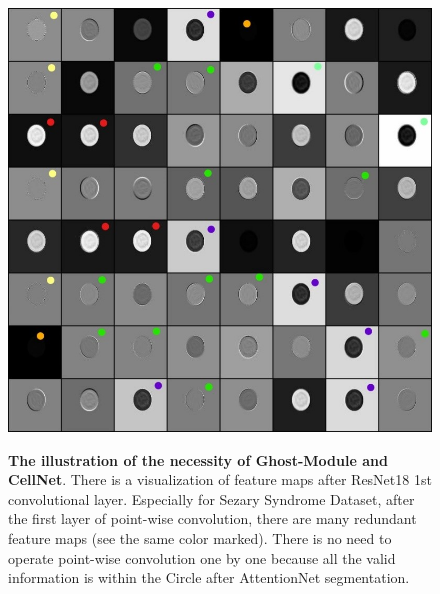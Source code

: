 \begin{figure}[t]
\begin{center}
\includegraphics[height=0.25\textheight]{thesis-template-master/images/cellnetnecc3.jpg}
\label{fig:cellnet}
\end{center}
\caption{\textbf{The illustration of the necessity of Ghost-Module and CellNet}. There is a visualization of feature maps after ResNet18\cite{20} 1st convolutional layer. Especially for Sezary Syndrome Dataset, after the first layer of point-wise convolution, there are many redundant feature maps (see the same color marked). There is no need to operate point-wise convolution one by one because all the valid information is within the Circle after AttentionNet segmentation.}
\label{fig:4.9}
\end{figure}

